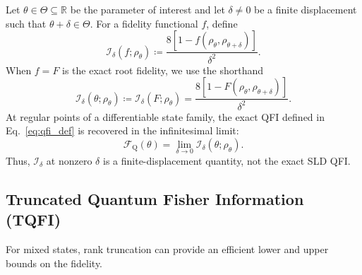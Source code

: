 \begin{definition}
    \label{def:finite_displacement_functional}
    Let $\theta\in\Theta\subseteq\mathbb{R}$ be the parameter of interest and let $\delta\neq0$ be a finite displacement such that $\theta+\delta\in\Theta$. For a fidelity functional $f$, define
    \begin{equation}
        \mathcal{I}_\delta(f;\rho_\theta)
        \coloneqq
        \frac{8\left[1-f(\rho_\theta,\rho_{\theta+\delta})\right]}{\delta^2}.
        \label{eq:qfi_difference_quotient}
    \end{equation}
    When $f=F$ is the exact root fidelity, we use the shorthand
    \begin{equation}
        \mathcal{I}_\delta(\theta;\rho_\theta)
        \coloneqq
        \mathcal{I}_\delta(F;\rho_\theta)
        =
        \frac{8\left[1-F(\rho_\theta,\rho_{\theta+\delta})\right]}{\delta^2}.
    \end{equation}
    At regular points of a differentiable state family, the exact QFI defined in Eq.~\eqref{eq:qfi_def} is recovered in the infinitesimal limit:
    \begin{equation}
        \mathcal{F}_{\mathrm{Q}}(\theta)
        =
        \lim_{\delta\to0}\mathcal{I}_\delta(\theta;\rho_\theta).
    \end{equation}
    Thus, $\mathcal{I}_\delta$ at nonzero $\delta$ is a finite-displacement quantity, not the exact SLD QFI.
\end{definition}


\subsection{Truncated Quantum Fisher Information (TQFI)}
For mixed states, rank truncation can provide an efficient lower and upper bounds on the fidelity.

